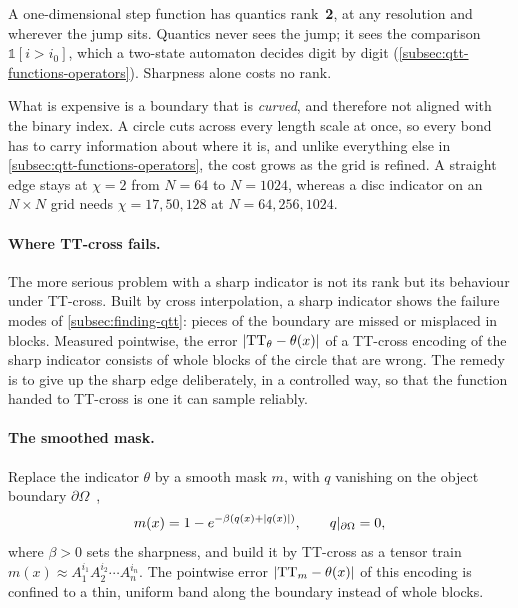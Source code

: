 A one-dimensional step function has quantics rank~\textbf{2}, at any resolution
and wherever the jump sits. Quantics never sees the jump; it sees the comparison
$\mathbb{1}[i > i_0]$, which a two-state automaton decides digit by digit
(\cref{subsec:qtt-functions-operators}). Sharpness alone costs no rank.

What is expensive is a boundary that is \emph{curved}, and therefore not aligned
with the binary index. A circle cuts across every length scale at once, so every
bond has to carry information about where it is, and unlike everything else in
\cref{subsec:qtt-functions-operators}, the cost grows as the grid is refined. A
straight edge stays at $\chi=2$ from $N=64$ to $N=1024$, whereas a disc indicator
on an $N \times N$ grid needs $\chi = 17, 50, 128$ at $N = 64, 256, 1024$.

\paragraph{Where TT-cross fails.}
The more serious problem with a sharp indicator is not its rank but its
behaviour under TT-cross. Built by cross interpolation, a sharp indicator shows
the failure modes of \cref{subsec:finding-qtt}: pieces of the boundary are
missed or misplaced in blocks. Measured pointwise, the error
$\left|\mathrm{TT}_\theta - \theta(x)\right|$ of a TT-cross encoding of the sharp
indicator consists of whole blocks of the circle that are wrong. The remedy is to
give up the sharp edge deliberately, in a controlled way, so that the function
handed to TT-cross is one it can sample reliably.

\paragraph{The smoothed mask.}
Replace the indicator $\theta$ by a smooth mask $m$, with $q$ vanishing on the
object boundary $\partial\Omega$~\cite{Peddinti2024},
\begin{equation}
  m(x) = 1 - e^{-\beta\left(q(x) + \left|q(x)\right|\right)},
  \qquad q|_{\partial\Omega} = 0 ,
  \label{eq:smoothed-mask}
\end{equation}%
where $\beta > 0$ sets the sharpness, and build it by TT-cross as a tensor train
$m(x) \approx A_1^{i_1} A_2^{i_2} \cdots A_n^{i_n}$. The pointwise error
$\left|\mathrm{TT}_m - \theta(x)\right|$ of this encoding is confined to a thin, uniform
band along the boundary instead of whole blocks.

